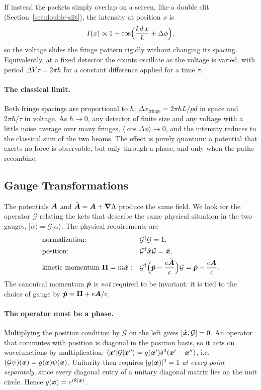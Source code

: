 If instead the packets simply overlap on a screen, like a double slit (Section~\ref{sec:double-slit}), the intensity at position $x$ is
\[
    I(x)\propto1 + \cos\Bigl(\frac{kd\,x}{L} + \Delta\phi\Bigr),
\]
so the voltage slides the fringe pattern rigidly without changing its spacing. Equivalently, at a fixed detector the counts oscillate as the voltage is varied, with period $\Delta V\,\tau = 2\pi\hbar$ for a constant difference applied for a time $\tau$.

\paragraph{The classical limit.} Both fringe spacings are proportional to $\hbar$: $\Delta x_{\text{fringe}} = 2\pi\hbar L/pd$ in space and $2\pi\hbar/\tau$ in voltage. As $\hbar\to0$, any detector of finite size and any voltage with a little noise average over many fringes, $\langle\cos\Delta\phi\rangle\to0$, and the intensity reduces to the classical sum of the two beams. The effect is purely quantum: a potential that exerts no force is observable, but only through a phase, and only when the paths recombine.

\subsection{Gauge Transformations}
\label{sec:gauge}

The potentials $\vect{A}$ and $\tilde{\vect{A}} = \vect{A} + \grad\Lambda$ produce the same field. We look for the operator $\mathcal{G}$ relating the kets that describe the same physical situation in the two gauges, $|\tilde\alpha\rangle = \mathcal{G}|\alpha\rangle$. The physical requirements are
\begin{align*}
    &\text{normalization:} && \mathcal{G}^\dagger\mathcal{G} = 1,\\
    &\text{position:} && \mathcal{G}^\dagger\hat{\lvect{x}}\mathcal{G} = \hat{\lvect{x}},\\
    &\text{kinetic momentum } \bm{\Pi} = m\dot{\lvect{x}}: && \mathcal{G}^\dagger\Bigl(\hat{\lvect{p}} - \frac{e\tilde{\vect{A}}}{c}\Bigr)\mathcal{G} = \hat{\lvect{p}} - \frac{e\vect{A}}{c}.
\end{align*}
The canonical momentum $\hat{\bm{p}}$ is \emph{not} required to be invariant: it is tied to the choice of gauge by $\hat{\lvect{p}} = \bm{\Pi} + e\vect{A}/c$.

\paragraph{The operator must be a phase.} Multiplying the position condition by $\mathcal{G}$ on the left gives $[\hat{\bm{x}},\mathcal{G}] = 0$. An operator that commutes with position is diagonal in the position basis, so it acts on wavefunctions by multiplication: $\langle\bm{x}'|\mathcal{G}|\bm{x}''\rangle = g(\bm{x}')\delta^3(\bm{x}'-\bm{x}'')$, i.e.\ $(\mathcal{G}\psi)(\bm{x}) = g(\bm{x})\psi(\bm{x})$. Unitarity then requires $|g(\bm{x})|^2 = 1$ \emph{at every point separately}, since every diagonal entry of a unitary diagonal matrix lies on the unit circle. Hence $g(\bm{x}) = e^{i\theta(\bm{x})}$.


